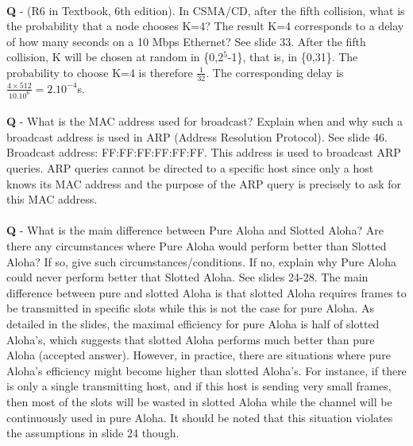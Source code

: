 \documentclass{llncs}
\newcounter{ques}
\newcommand{\quest}[2]{\paragraph{}\textbf{Q\theques} - #1\stepcounter{ques} }
\newcommand{\answer}[1]{
\noindent\color{red}A: #1\color{black}}
\begin{document}
\quest{(R6 in Textbook, 6th edition). In CSMA/CD, after the fifth collision, what is the
  probability that a node chooses K=4? The result K=4 corresponds to a
  delay of how many seconds on a 10 Mbps Ethernet?}

\answer{See slide 33. After the fifth collision, K will be chosen at
  random in \{0,2$^5$-1\}, that is, in \{0,31\}. The probability to
  choose K=4 is therefore $\frac{1}{32}$. The corresponding delay is
  $\frac{4 \times 512}{10.10^6}=2.10^{-4}$s.}

\quest{What is the MAC address used for broadcast? Explain when and
  why such a broadcast address is used in ARP (Address Resolution
  Protocol).}

\answer{See slide 46. Broadcast address: FF:FF:FF:FF:FF:FF. This
  address is used to broadcast ARP queries. ARP queries cannot be
  directed to a specific host since only a host knows its MAC address
  and the purpose of the ARP query is precisely to ask for this MAC
  address.}

\quest{What is the main difference between Pure Aloha and Slotted Aloha? Are there any
circumstances where Pure Aloha would perform better than Slotted Aloha? If so, give
such circumstances/conditions. If no, explain why Pure Aloha could never perform better
that Slotted Aloha.}

\answer{See slides 24-28. The main difference between pure and slotted
  Aloha is that slotted Aloha requires frames to be transmitted in
  specific slots while this is not the case for pure Aloha. As
  detailed in the slides, the maximal efficiency for pure Aloha is
  half of slotted Aloha's, which suggests that slotted Aloha performs
  much better than pure Aloha (accepted answer). However, in practice,
  there are situations where pure Aloha's efficiency might become
  higher than slotted Aloha's. For instance, if there is only a single
  transmitting host, and if this host is sending very small frames,
  then most of the slots will be wasted in slotted Aloha while the
  channel will be continuously used in pure Aloha. It should be noted
  that this situation violates the assumptions in slide 24 though.  }
\end{document}
